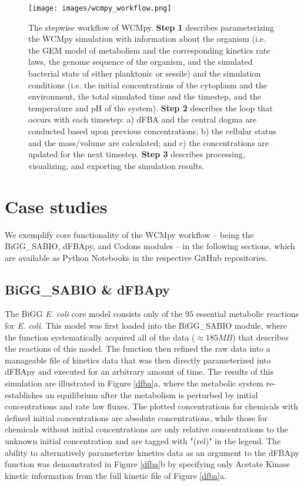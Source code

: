 \begin{figure}
    \centering
    \texttt{[image: images/wcmpy\_workflow.png]}
    \caption{
        The stepwise workflow of WCMpy. \textbf{Step 1} describes parameterizing the WCMpy simulation with information about the organism (i.e. the GEM model of metabolism and the corresponding kinetics rate laws, the genome sequence of the organism, and the simulated bacterial state of either planktonic or sessile) and the simulation conditions (i.e. the initial concentrations of the cytoplasm and the environment, the total simulated time and the timestep, and the temperature and pH of the system). \textbf{Step 2} describes the loop that occurs with each timestep: a) dFBA and the central dogma are conducted based upon previous concentrations; b) the cellular status and the mass/volume are calculated; and c) the concentrations are updated for the next timestep. \textbf{Step 3} describes processing, visualizing, and exporting the simulation results. 
    }
    \label{wcmpy_workflow}
\end{figure}

\section{Case studies}
We exemplify core functionality of the WCMpy workflow -- being the BiGG\_SABIO, dFBApy, and Codons modules -- in the following sections, which are available as Python Notebooks in the respective GitHub repositories.

\subsection{BiGG\_SABIO \& dFBApy}
The BiGG \textit{E. coli} core model consists only of the $95$ essential metabolic reactions for \textit{E. coli}. This model was first loaded into the BiGG\_SABIO module, where the  function systematically acquired all of the data ($\approx 185 MB$) that describes the reactions of this model. The  function then refined the raw data into a manageable file of kinetics data that was then directly parameterized into dFBApy and executed for an arbitrary amount of time. The results of this simulation are illustrated in Figure \ref{dfba}a, where the metabolic system re-establishes an equilibrium after the metabolism is perturbed by initial concentrations and rate law fluxes. The plotted concentrations for chemicals with defined initial concentrations are absolute concentrations, while those for chemicals without initial concentrations are only relative concentrations to the unknown initial concentration and are tagged with "(rel)" in the legend. The ability to alternatively parameterize kinetics data as an argument to the  dFBApy function was demonstrated in Figure \ref{dfba}b by specifying only Acetate Kinase kinetic information from the full kinetic file of Figure \ref{dfba}a. 

